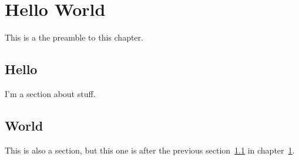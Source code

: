 \chapter{Hello World}\label{sec:hello-world}

This is a the preamble to this chapter.

\section{Hello}\label{sec:hello}

I'm a section about stuff.

\section{World}

This is also a section, but this one is after the previous section~\ref{sec:hello} in chapter~\ref{sec:hello-world}.